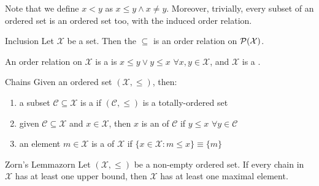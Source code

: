 Note that we define $ x < y $ as $ x \leq y \land x \neq y $. Moreover, trivially, every subset of an ordered set is an ordered set too, with the induced order relation.

\begin{example}{Inclusion}{}
  Let $ \mathcal{X} $ be a set. Then the  $ \subseteq $ is an order relation on $ \mathcal{P}(\mathcal{X}) $.
\end{example}

An order relation on $ \mathcal{X} $ is a  is $ x \leq y \lor y \leq x \,\,\forall x,y \in \mathcal{X} $, and $ \mathcal{X} $ is a \footnotemark.


\begin{definition}{Chains}{}
  Given an ordered set $ (\mathcal{X} , \leq) $, then:
  \begin{enumerate}
    \item a subset $ \mathcal{C} \subseteq \mathcal{X} $ is a  if $ (\mathcal{C} , \leq) $ is a totally-ordered set
    \item given $ \mathcal{C} \subseteq \mathcal{X} $ and $ x \in \mathcal{X} $, then $ x $ is an  of $ \mathcal{C} $ if $ y \leq x \,\,\forall y \in \mathcal{C} $
    \item an element $ m \in \mathcal{X} $ is a  of $ \mathcal{X} $ if $ \{x \in \mathcal{X} : m \leq x \} \equiv \{m\} $
  \end{enumerate}
\end{definition}

\begin{lemma}{Zorn's Lemma}{zorn}
  Let $ (\mathcal{X} , \leq) $ be a non-empty ordered set. If every chain in $ \mathcal{X} $ has at least one upper bound, then $ \mathcal{X} $ has at least one maximal element.
\end{lemma}










